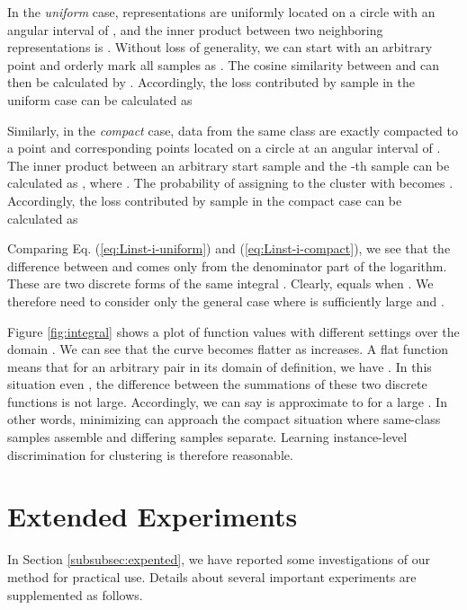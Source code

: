 \documentclass{article} \usepackage{iclr2021_conference,times}
\begin{document}
In the {\it uniform} case,  representations are uniformly located on a circle with an angular interval of , and the inner product between two neighboring representations is . Without loss of generality, we can start with an arbitrary point  and orderly mark all samples as . The cosine similarity between  and  can then be calculated by . Accordingly, the loss contributed by sample  in the uniform case can be calculated as



Similarly, in the {\it compact} case,  data from the same class are exactly compacted to a point and  corresponding points located on a circle at an angular interval of .  The inner product between an arbitrary start sample  and the -th sample can be calculated as , where . The probability of assigning  to the cluster with  becomes . Accordingly, the loss contributed by sample  in the compact case can be calculated as


Comparing Eq. (\ref{eq:Linst-i-uniform}) and (\ref{eq:Linst-i-compact}), we see that the difference between  and  comes only from the denominator part of the logarithm. These are two discrete forms of the same integral . Clearly,  equals  when . We therefore need to consider only the general case where  is sufficiently large and .

Figure \ref{fig:integral} shows a plot of function values  with different  settings over the domain . We can see that the curve becomes flatter as  increases. 
A flat function  means that for an arbitrary  pair in its domain of definition, we have . In this situation even , the difference between the summations of these two discrete functions is not large. Accordingly, we can say  is approximate to  for a large . In other words, minimizing  can approach the compact situation where same-class samples assemble and differing samples separate. Learning instance-level discrimination for clustering is therefore reasonable.


\section{Extended Experiments}
\label{expteriment_extend}
In Section \ref{subsubsec:expented}, we have reported some investigations of our method for practical use. Details about several important experiments are supplemented as follows.
\end{document}
